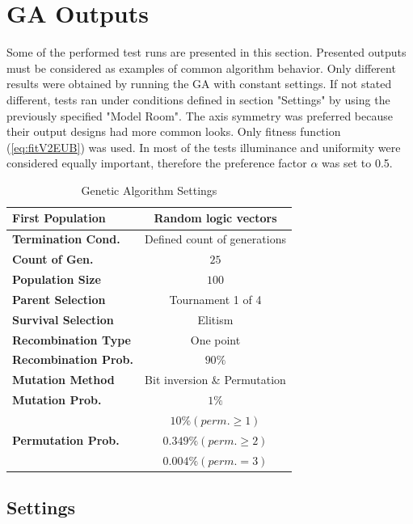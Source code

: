 \section{GA Outputs}

Some of the performed test runs are presented in this section. Presented outputs must be considered as examples of common algorithm behavior. Only different results were obtained by running the GA with constant settings. If not stated different, tests ran under conditions defined in section "Settings" by using the previously specified "Model Room". The axis symmetry was preferred because their output designs had more common looks. Only fitness function (\ref{eq:fitV2EUB}) was used. In most of the tests illuminance and uniformity were considered equally important, therefore the preference factor $\alpha$ was set to 0.5.

\begin{table}[b]
	\renewcommand{\arraystretch}{1.3}
	\caption{Genetic Algorithm Settings}
 	\label{tab:GAsettings}
	\centering
  \begin{tabular}{| l | c |}
    \hline
    \textbf{First Population} & Random logic vectors \\
    \hline
    \textbf{Termination Cond.} & Defined count of generations \\
    \hline
		\textbf{Count of Gen.} & $25$ \\
    \hline
		\textbf{Population Size} & $100$ \\
	\hline
		\textbf{Parent Selection} & Tournament 1 of 4 \\
    \hline
		\textbf{Survival Selection} & Elitism \\
	\hline
		\textbf{Recombination Type} & One point \\
    \hline
		\textbf{Recombination Prob.} & $90 \%$ \\
	\hline
		\textbf{Mutation Method} & Bit inversion \& Permutation\\
	\hline
		\textbf{Mutation Prob.} & $1 \%$ \\
	\hline
		& $10 \% \left( perm. \geq 1\right)$\\
		\textbf{Permutation Prob.} &  $0.349 \% \left( perm. \geq 2\right)$ \\
		&$0.004 \% \left( perm. = 3\right)$\\
    \hline
  \end{tabular}
\end{table}

\subsection{Settings}

